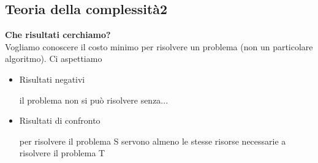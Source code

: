 \subsection{Teoria della complessità2}
\textbf{Che risultati cerchiamo?}\\
Vogliamo conoscere il costo minimo per risolvere un problema (non un particolare algoritmo). Ci aspettiamo
\begin{itemize}
    \item Risultati negativi
    
    il problema non si può risolvere senza...
    
    \item Risultati di confronto
    
    per risolvere il problema S servono almeno le stesse risorse necessarie a risolvere il problema T
\end{itemize}
